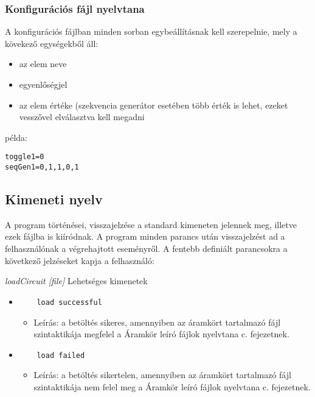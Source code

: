 \subsubsection{Konfigurációs fájl nyelvtana}

A konfigurációs fájlban minden sorban egybeállításnak kell szerepelnie, mely a kövekező egységekből áll:
\begin{itemize}
	\item az elem neve
	\item egyenlőségjel
	\item az elem értéke (szekvencia generátor esetében több érték is lehet, ezeket vesszővel elválasztva kell megadni
\end{itemize}

példa:
\begin{verbatim}
toggle1=0
seqGen1=0,1,1,0,1
\end{verbatim}

\subsection{Kimeneti nyelv}

A program történései, visszajelzése a standard kimeneten jelennek meg, illetve ezek fájlba is kiíródnak. A program minden parancs után visszajelzést ad a felhasználónak a végrehajtott eseményről. A fentebb definiált parancsokra a következő jelzéseket kapja a felhasználó:\newline

\textit{loadCircuit [file]}\newline
Lehetséges kimenetek
\begin{itemize}
	\item
	\begin{verbatim}
	load successful
	\end{verbatim}
	\begin{itemize}
		\item Leírás: a betöltés sikeres, amennyiben az áramkört tartalmazó fájl szintaktikája megfelel a Áramkör leíró fájlok nyelvtana c. fejezetnek.
	\end{itemize}
	\item 
	\begin{verbatim}
	load failed
	\end{verbatim}
	\begin{itemize}
		\item Leírás: a betöltés sikertelen, amennyiben az áramkört tartalmazó fájl szintaktikája nem felel meg a Áramkör leíró fájlok nyelvtana c. fejezetnek.
	\end{itemize}
\end{itemize}

